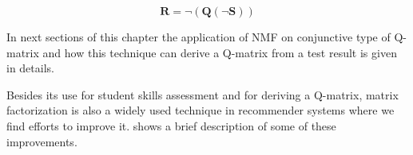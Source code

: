 \begin{equation}
\mathbf{R}=\neg\left(\mathbf{Q}\left(\neg\mathbf{S}\right)\right)\label{eq:6}
\end{equation}

In next sections of this chapter the application of NMF on conjunctive type of Q-matrix and how this technique can derive a Q-matrix from a test result is given in details.

Besides its use for student skills assessment and for deriving a Q-matrix, matrix factorization is also a widely used technique in recommender systems where we find efforts to improve it.  \citep{koren2009matrix} shows a brief description of some of these improvements. 







